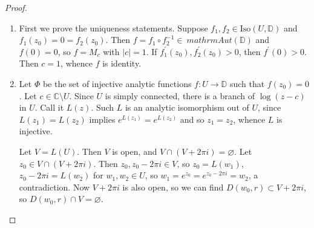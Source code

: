 \begin{proof}
\begin{enumerate}
  \item{
    First we prove the uniqueness statements. Suppose
    $f_1, f_2 \in \mathrm{Iso}(U, \mathbb{D})$ and
    $f_1(z_0) = 0 = f_2(z_0)$. Then
    $f = f_1 \circ f_2^{-1} \in \ mathrm{Aut}(\mathbb{D})$ and $f(0) = 0$,
    so $f = M_c$ with $|c| = 1$. If $f_1^\prime(z_0), f_2^\prime(z_0) >
    0$,
    then $f^\prime(0) > 0$. Then $c = 1$, whence $f$ is identity.
  }
  \item{
    Let $\Phi$ be the set of injective analytic functions
    $f : U \to \mathbb{D}$ such that $f(z_0) = 0$. Let
    $c \in \mathbb{C} \setminus U$. Since $U$ is simply connected,
    there is a branch of $\log(z - c)$ in $U$. Call it $L(z)$. Such
    $L$ is an analytic isomorphism out of $U$, since
    $L(z_1) = L(z_2)$ implies $e^{L(z_1)} = e^{L(z_2)}$  and so $z_1 =
    z_2$, whence $L$ is injective.

    Let $V = L(U)$. Then $V$ is open, and
    $V \cap (V + 2 \pi i) = \varnothing$. Let
    $z_0 \in V \cap (V + 2 \pi i)$. Then $z_0, z_0 - 2 \pi i \in V$,
    so $z_0 = L(w_1)$, $z_0 - 2\pi i = L(w_2)$ for $w_1, w_2 \in U$,
    so $w_1 = e^{z_0} = e^{z_0 - 2 \pi i} = w_2$, a contradiction.
    Now $V + 2 \pi i$ is also open, so we can find
    $D(w_0, r) \subset V + 2 \pi i$, so $D(w_0, r) \cap V = \varnothing$.

}
\end{enumerate}
\end{proof}

